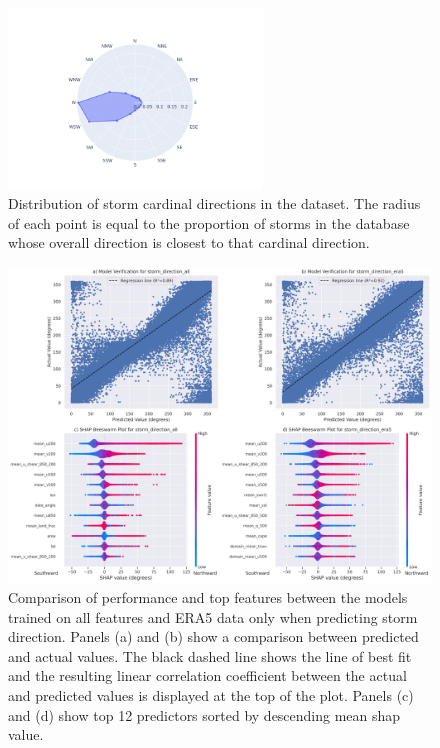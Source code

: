 \begin{figure}[ht]
    \centering
    \includegraphics[width=0.6\textwidth]{../figures/generated/exploration/storm_cardinal_directions_distribution.png}
    \caption{Distribution of storm cardinal directions in the dataset. The radius of each point is equal to the proportion of storms in the database whose overall direction is closest to that cardinal direction.}
    \label{fig:storm_cardinal_directions_distribution}
\end{figure}

\begin{figure}[ht]
    \centering
    \includegraphics[width=\textwidth]{../figures/generated/experiments/storm_direction/storm_direction_summary.png}
    \caption{Comparison of performance and top features between the models trained on all features and ERA5 data only when predicting storm direction. Panels (a) and (b) show a comparison between predicted and actual values. The black dashed line shows the line of best fit and the resulting linear correlation coefficient between the actual and predicted values is displayed at the top of the plot. Panels (c) and (d) show top 12 predictors sorted by descending mean \acrshort{shap} value.}
    \label{fig:storm_direction_summary}
\end{figure}

